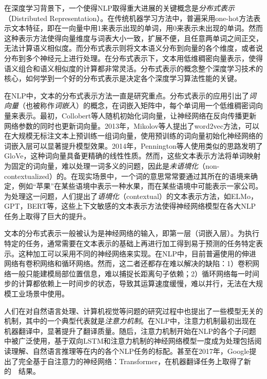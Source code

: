 在深度学习背景下，一个使得NLP取得重大进展的关键概念是\emph{分布式表示}（Distributed Representation）\cite{Hinton:1986:DR:104279.104287}。在传统机器学习方法中，普遍采用one-hot方法表示文本特征，即在一向量中用1来表示出现的单词，用0来表示未出现的单词。然而这种表示方法使得向量维度与词表大小一致，扩展不便，且任意两单词之间正交，无法计算语义相似度。而分布式表示则将文本语义分布到向量的各个维度，或者说分布到多个神经元上进行处理。在分布式表示下，文本用低维稠密向量表示，使得语义组合和语义相似度的计算都非常灵活。分布式表示的概念整个深度学习技术的核心，如何学到一个好的分布式表示是决定各个深度学习算法性能的关键。

在NLP中，文本的分布式表示方法一直是研究重点。分布式表示的应用引出了\emph{词向量}（也被称作\emph{词嵌入}）的概念，在词嵌入矩阵中，每个单词用一个低维稠密词向量来表示。最初，Collobert等人\cite{DBLP:conf/icml/CollobertW08}随机初始化词向量，让神经网络在反向传播更新网络参数的同时也更新词向量。2013年，Mikolov等人\cite{DBLP:conf/nips/MikolovSCCD13}提出了word2vec方法，可以在大规模无标注文本上预训练一组词向量，使用预训练的词向量初始化神经网络的词嵌入层可以显著提升模型效果。2014年，Pennington等人\cite{DBLP:conf/emnlp/PenningtonSM14}使用类似的思路发明了GloVe，这种词向量具备更精确的线性性质。然而，这些文本表示方法将单词映射为固定的词向量，难以处理一词多义的问题，因此是\emph{未语境化}（non-contextualized）的。在现实场景中，一个词的意思常常要通过其所在的语境来确定，例如“苹果”在某些语境中表示一种水果，而在某些语境中可能表示一家公司。为处理这一问题，人们提出了\emph{语境化}（contextual）的文本表示方法，如ELMo\cite{DBLP:conf/naacl/PetersNIGCLZ18}，GPT\cite{radford2018improving}，BERT\cite{devlin2018bert}等，这些上下文敏感的文本表示方法使得神经网络模型在各大NLP任务上取得了巨大的提升。

文本的分布式表示一般被认为是神经网络的输入，即第一层（词嵌入层）。为执行特定的任务，通常需要在文本表示的基础上再进行加工得到易于预测的任务特定表示。这种加工可以采用不同的神经网络来实现。在NLP中，目前普遍使用的伸进网络有卷积网络\cite{DBLP:conf/icml/GehringAGYD17}\cite{DBLP:conf/emnlp/Kim14}和循环网络\cite{DBLP:conf/acl/MaH16}\cite{DBLP:conf/emnlp/WenGMSVY15}。然而，这二者还都存在难以解决的缺陷：1）卷积网络一般只能建模局部位置信息，难以捕捉长距离句子依赖；2）循环网络每一时间步的计算都依赖上一时间步的状态，导致其运算速度缓慢，难以并行，无法在大规模工业场景中使用。

人们在对自然语言处理、计算机视觉等问题的研究过程中也提出了一些模型无关的机制，其中的一个典型代表就是\emph{注意力机制}。在NLP中，注意力机制最初出现在机器翻译中，显著提升了翻译质量\cite{DBLP:journals/corr/BahdanauCB14}。随后，注意力机制开始在NLP的各个子问题中被广泛使用，基于双向LSTM和注意力机制的神经网络模型一度成为处理包括阅读理解、自然语言推理等在内的各个NLP任务的标配。甚至在2017年，Google提出了完全基于自注意力的神经网络：Transformer\cite{DBLP:conf/nips/VaswaniSPUJGKP17}，在机器翻译任务上取得了新的~\sArt~结果。

